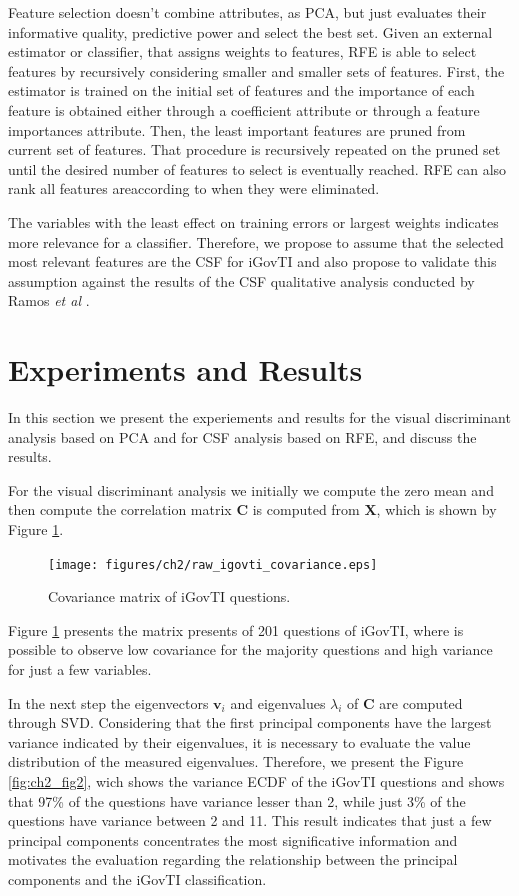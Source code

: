 Feature selection doesn't combine attributes, as PCA, but just evaluates their informative quality, predictive power and select the best set. Given an external estimator or classifier, that assigns weights to features, RFE is able to select features by recursively considering smaller and smaller sets of features. First, the estimator is trained on the initial set of features and the importance of each feature is obtained either through a coefficient attribute or through a feature importances attribute. Then, the least important features are pruned from current set of features. That procedure is recursively repeated on the pruned set until the desired number of features to select is eventually reached. RFE can also rank all features areaccording to when they were eliminated. 

The variables with the least effect on training errors or largest weights indicates more relevance for a classifier. Therefore, we propose to assume that the selected most relevant features are the CSF for iGovTI and also propose to validate this assumption against the results of the CSF qualitative analysis conducted by Ramos \emph{et al} \cite{ramos2016information}.

\section{Experiments and Results}
\label{sec:ch2_experimentalresults}

In this section we present the experiements and results for the visual discriminant analysis based on PCA and for CSF analysis based on RFE, and discuss the results.

For the visual discriminant analysis we initially we compute the zero mean and then compute the correlation matrix $\mathbf{C}$ is computed from $\mathbf{X}$, which is shown by Figure \ref{fig:ch2_fig1}.
 
\begin{figure}[h!]
     \centering 
     \texttt{[image: figures/ch2/raw\_igovti\_covariance.eps]}
     \caption{Covariance matrix of iGovTI questions.}
     \label{fig:ch2_fig1}
\end{figure}

Figure \ref{fig:ch2_fig1} presents the matrix presents of 201 questions of iGovTI, where is possible to observe low covariance for the majority questions and high variance for just a few variables. 

In the next step the eigenvectors $\mathbf{v}_i$ and eigenvalues $\lambda_i$ of $\mathbf{C}$ are computed through SVD. Considering that the first principal components have the largest variance indicated by their eigenvalues, it is necessary to evaluate the value distribution of the measured eigenvalues. Therefore, we present the Figure \ref{fig:ch2_fig2}, wich shows the variance ECDF of the iGovTI questions and shows that 97\% of the questions have variance lesser than 2, while just 3\% of the questions have variance between 2 and 11. This result indicates that just a few principal components concentrates the most significative information and motivates the evaluation regarding the relationship between the principal components and the iGovTI classification.

